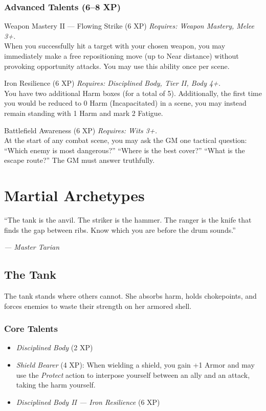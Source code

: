 \documentclass[9pt,a5paper]{extbook}
\begin{document}
\subsection{Advanced Talents (6--8 XP)}

\begin{talentbox}{Weapon Mastery II --- Flowing Strike (6 XP)}
\textit{Requires: Weapon Mastery, Melee 3+.} \\
When you successfully hit a target with your chosen weapon, you may immediately make a free repositioning move (up to Near distance) without provoking opportunity attacks. You may use this ability once per scene.
\end{talentbox}

\begin{talentbox}{Iron Resilience (6 XP)}
\textit{Requires: Disciplined Body, Tier II, Body 4+.} \\
You have two additional Harm boxes (for a total of 5). Additionally, the first time you would be reduced to 0 Harm (Incapacitated) in a scene, you may instead remain standing with 1 Harm and mark 2 Fatigue.
\end{talentbox}

\begin{talentbox}{Battlefield Awareness (6 XP)}
\textit{Requires: Wits 3+.} \\
At the start of any combat scene, you may ask the GM one tactical question: ``Which enemy is most dangerous?'' ``Where is the best cover?'' ``What is the escape route?'' The GM must answer truthfully.
\end{talentbox}

\clearpage

\chapter{Martial Archetypes}
\epigraph{``The tank is the anvil. The striker is the hammer. The ranger is the knife that finds the gap between ribs. Know which you are before the drum sounds.''}{\textit{--- Master Tarian}}

\section{The Tank}

The tank stands where others cannot. She absorbs harm, holds chokepoints, and forces enemies to waste their strength on her armored shell.

\subsection{Core Talents}
\begin{itemize}
    \item \textit{Disciplined Body} (2 XP)
    \item \textit{Shield Bearer} (4 XP): When wielding a shield, you gain +1 Armor and may use the \textit{Protect} action to interpose yourself between an ally and an attack, taking the harm yourself.
    \item \textit{Disciplined Body II --- Iron Resilience} (6 XP)
\end{itemize}
\end{document}
